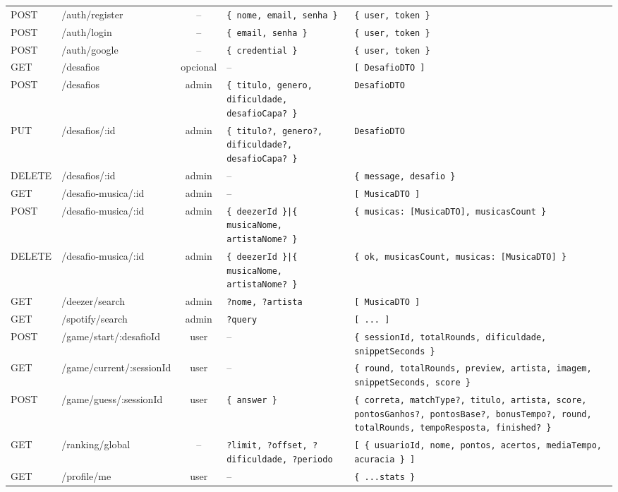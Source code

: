\documentclass[12pt,a4paper]{article}
\begin{document}
\begin{longtable}{@{} l l c p{} p{} @{}}
POST & /auth/register & -- & \texttt{\{ nome, email, senha \}} & \texttt{\{ user, token \}} \\
POST & /auth/login & -- & \texttt{\{ email, senha \}} & \texttt{\{ user, token \}} \\
POST & /auth/google & -- & \texttt{\{ credential \}} & \texttt{\{ user, token \}} \\
\midrule
GET & /desafios & opcional & -- & \texttt{[ DesafioDTO ]} \\
POST & /desafios & admin & \texttt{\{ titulo, genero, dificuldade, desafioCapa? \}} & \texttt{DesafioDTO} \\
PUT & /desafios/:id & admin & \texttt{\{ titulo?, genero?, dificuldade?, desafioCapa? \}} & \texttt{DesafioDTO} \\
DELETE & /desafios/:id & admin & -- & \texttt{\{ message, desafio \}} \\
\midrule
GET & /desafio-musica/:id & admin & -- & \texttt{[ MusicaDTO ]} \\
POST & /desafio-musica/:id & admin & \texttt{\{ deezerId \}|\{ musicaNome, artistaNome? \}} & \texttt{\{ musicas: [MusicaDTO], musicasCount \}} \\
DELETE & /desafio-musica/:id & admin & \texttt{\{ deezerId \}|\{ musicaNome, artistaNome? \}} & \texttt{\{ ok, musicasCount, musicas: [MusicaDTO] \}} \\
\midrule
GET & /deezer/search & admin & \texttt{?nome, ?artista} & \texttt{[ MusicaDTO ]} \\
GET & /spotify/search & admin & \texttt{?query} & \texttt{[ ... ]} \\
\midrule
POST & /game/start/:desafioId & user & -- & \texttt{\{ sessionId, totalRounds, dificuldade, snippetSeconds \}} \\
GET & /game/current/:sessionId & user & -- & \texttt{\{ round, totalRounds, preview, artista, imagem, snippetSeconds, score \}} \\
POST & /game/guess/:sessionId & user & \texttt{\{ answer \}} & \texttt{\{ correta, matchType?, titulo, artista, score, pontosGanhos?, pontosBase?, bonusTempo?, round, totalRounds, tempoResposta, finished? \}} \\
\midrule
GET & /ranking/global & -- & \texttt{?limit, ?offset, ?dificuldade, ?periodo} & \texttt{[ \{ usuarioId, nome, pontos, acertos, mediaTempo, acuracia \} ]} \\
GET & /profile/me & user & -- & \texttt{\{ ...stats \}} \\
\end{longtable}
\endgroup
\end{document}
